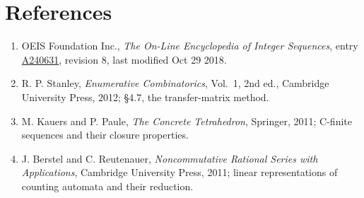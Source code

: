 \documentclass[11pt]{article}
\theoremstyle{definition}
\begin{document}
\section{References}

\begin{enumerate}

\item OEIS Foundation Inc., \emph{The On-Line Encyclopedia of Integer Sequences}, entry \href{https://oeis.org/A240631}{A240631}, revision 8, last modified Oct 29 2018.

\item R. P. Stanley, \emph{Enumerative Combinatorics}, Vol.~1, 2nd ed., Cambridge University Press, 2012; \S4.7, the transfer-matrix method.

\item M. Kauers and P. Paule, \emph{The Concrete Tetrahedron}, Springer, 2011; C-finite sequences and their closure properties.

\item J. Berstel and C. Reutenauer, \emph{Noncommutative Rational Series with Applications}, Cambridge University Press, 2011; linear representations of counting automata and their reduction.

\end{enumerate}
\end{document}
